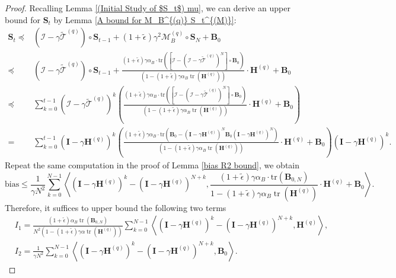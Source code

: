 \documentclass[11pt, letterpaper]{article}
\begin{document}
\begin{proof}
    Recalling Lemma \ref{(Initial Study of $S_t$) mu}, we can derive an upper bound for $\mathbf{S}_t$ by Lemma \ref{A bound for M_B^{(q)} S_t^{(M)}}:
    \begin{equation*}
        \begin{aligned}
            \mathbf{S}_{t}\preceq&(\mathcal{I}-\gamma\tilde{\mathcal{T}}^{(q)})\circ\mathbf{S}_{t-1}+(1+\tilde{\epsilon})\gamma^{2}\mathcal{M}_B^{(q)}\circ\mathbf{S}_{N}+\mathbf{B}_{0}\\
            \preceq &(\mathcal{I}-\gamma\tilde{\mathcal{T}}^{(q)})\circ\mathbf{S}_{t-1}+\frac{(1+\tilde{\epsilon})\gamma\alpha_B\cdot\mathrm{tr}\left(\left[\mathcal{I}-(\mathcal{I}-\gamma\widetilde{\mathcal{T}}^{(q)})^N\right]\circ\mathbf{B}_0\right)}{(1-(1+\tilde{\epsilon})\gamma\alpha_B\operatorname{tr}(\mathbf{H}^{(q)}))}\cdot\mathbf{H}^{(q)}+\mathbf{B}_{0}\\
            \preceq&\sum_{k=0}^{t-1}(\mathcal{I}-\gamma\tilde{\mathcal{T}}^{(q)})^k\left(\frac{(1+\tilde{\epsilon})\gamma\alpha_B\cdot\mathrm{tr}\left(\left[\mathcal{I}-(\mathcal{I}-\gamma\widetilde{\mathcal{T}}^{(q)})^N\right]\circ\mathbf{B}_0\right)}{(1-(1+\tilde{\epsilon})\gamma\alpha_B\operatorname{tr}(\mathbf{H}^{(q)}))}\cdot\mathbf{H}^{(q)}+\mathbf{B}_{0}\right)\\
            =&\sum_{k=0}^{t-1}(\mathbf{I}-\gamma\mathbf{H}^{(q)})^k \left(\frac{(1+\tilde{\epsilon})\gamma\alpha_B\cdot\mathrm{tr}\left(\mathbf{B}_0-(\mathbf{I}-\gamma \mathbf{H}^{(q)})^N\mathbf{B}_0(\mathbf{I}-\gamma \mathbf{H}^{(q)})^N\right)}{(1-(1+\tilde{\epsilon})\gamma\alpha_B\operatorname{tr}(\mathbf{H}^{(q)}))}\cdot\mathbf{H}^{(q)}+\mathbf{B}_{0}\right) (\mathbf{I}-\gamma\mathbf{H}^{(q)})^k.
        \end{aligned}
    \end{equation*}
    Repeat the same computation in the proof of Lemma \ref{bias R2 bound}, we obtain
    \begin{equation}
        \label{eq: c21}
        \mathrm{bias}\leq\frac{1}{\gamma N^{2}}\sum_{k=0}^{N-1}\left\langle(\mathbf{I}-\gamma\mathbf{H}^{(q)})^{k}-(\mathbf{I}-\gamma\mathbf{H}^{(q)})^{N+k},\frac{(1+\tilde{\epsilon})\gamma\alpha_B\cdot\mathrm{tr}\left(\mathbf{B}_{0,N}\right)}{1-(1+\tilde{\epsilon})\gamma\alpha_B\operatorname{tr}(\mathbf{H}^{(q)})}\cdot\mathbf{H}^{(q)}+\mathbf{B}_{0}\right\rangle.
    \end{equation}
    Therefore, it suffices to upper bound the following two terms
    \begin{equation*}
        \begin{aligned}
            & I_{1}=\frac{(1+\tilde{\epsilon})\alpha_B\operatorname{tr}(\mathbf{B}_{0,N})}{N^2(1-(1+\tilde{\epsilon})\gamma\alpha\operatorname{tr}(\mathbf{H}^{(q)}))}\sum_{k=0}^{N-1}\left\langle(\mathbf{I}-\gamma\mathbf{H}^{(q)})^k-(\mathbf{I}-\gamma\mathbf{H}^{(q)})^{N+k},\mathbf{H}^{(q)}\right\rangle, \\
            & I_{2}=\frac{1}{\gamma N^2}\sum_{k=0}^{N-1}\left\langle(\mathbf{I}-\gamma\mathbf{H}^{(q)})^k-(\mathbf{I}-\gamma\mathbf{H}^{(q)})^{N+k},\mathbf{B}_0\right\rangle.
        \end{aligned}
    \end{equation*}


\end{proof}
\end{document}
